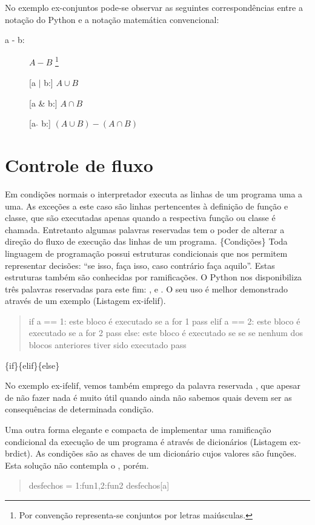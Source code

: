 \documentclass[a4paper,10pt,portuguese]{sphinxmanual}
\begin{document}
No exemplo ex-conjuntos pode-se observar as seguintes
correspondências entre a notação do Python e a notação matemática
convencional:
\begin{description}
\item[{a - b:}] \leavevmode
$A-B$ \footnote{
Por convenção representa-se conjuntos por letras maiúsculas.
}

{[}a $\mid$ b:{]} $A\cup B$

{[}a \& b:{]} $A\cap B$

{[}a $\hat{ }$ b:{]} $(A\cup B)-(A\cap B)$

\end{description}


\chapter{Controle de fluxo}
\label{Cap2:controle-de-fluxo}
Em condições normais o interpretador executa as linhas de um
programa uma a uma. As exceções a este caso são linhas pertencentes
à definição de função e classe, que são executadas apenas quando a
respectiva função ou classe é chamada. Entretanto algumas palavras
reservadas tem o poder de alterar a direção do fluxo de execução
das linhas de um programa. \{Condições\} Toda linguagem de
programação possui estruturas condicionais que nos permitem
representar decisões:
``se isso, faça isso, caso contrário faça aquilo''. Estas estruturas
também são conhecidas por ramificações. O Python nos disponibiliza
três palavras reservadas para este fim:  ,  e
. O seu uso é melhor demonstrado através de um exemplo
(Listagem ex-ifelif).
\begin{quote}

if a == 1: este bloco é executado se a for 1 pass elif a == 2: este
bloco é executado se a for 2 pass else: este bloco é executado se
se se nenhum dos blocos anteriores tiver sido executado pass
\end{quote}

\{if\}\{elif\}\{else\}

No exemplo ex-ifelif, vemos também emprego da palavra reservada
, que apesar de não fazer nada é muito útil quando ainda
não sabemos quais devem ser as consequências de determinada
condição.

Uma outra forma elegante e compacta de implementar uma ramificação
condicional da execução de um programa é através de dicionários
(Listagem ex-brdict). As condições são as chaves de um dicionário
cujos valores são funções. Esta solução não contempla o ,
porém.
\begin{quote}

desfechos = 1:fun1,2:fun2 desfechos{[}a{]}
\end{quote}
\end{document}
